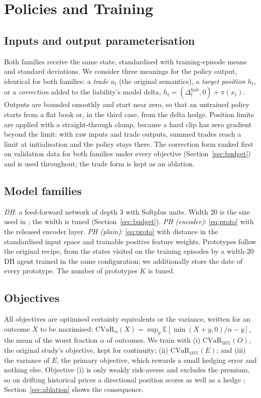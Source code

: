 \documentclass[10pt,conference]{IEEEtran}
\begin{document}
\section{Policies and Training}

\subsection{Inputs and output parameterisation}
\label{sec:param}
Both families receive the same state, standardised with training-episode
means and standard deviations. We consider three meanings for the policy
output, identical for both families: a \emph{trade} $a_t$ (the original
semantics), a \emph{target position} $h_t$, or a \emph{correction} added to
the liability's model delta, $h_t=(\Delta^{\mathrm{liab}}_t,0)+\pi(x_t)$.
Outputs are bounded smoothly and start near zero, so that an untrained policy
starts from a flat book or, in the third case, from the delta hedge. Position
limits are applied with a straight-through clamp, because a hard clip has
zero gradient beyond the limit: with raw inputs and trade outputs, summed
trades reach a limit at initialisation and the policy stays there. The
correction form ranked first on validation data for both families under every
objective (Section~\ref{sec:budget}) and is used throughout; the trade form
is kept as an ablation.

\subsection{Model families}
\emph{DH}: a feed-forward network of depth 3 with Softplus units. Width 20 is
the size used in \cite{buehler2019deep,faloughi2025protohedge}; the width is
tuned (Section~\ref{sec:budget}).
\emph{PH (encoder)}: \eqref{eq:proto} with the released encoder layer.
\emph{PH (plain)}: \eqref{eq:proto} with distance in the standardised input
space and trainable positive feature weights. Prototypes follow the original
recipe, from the states visited on the training episodes by a width-20 DH
agent trained in the same configuration; we additionally store the date of
every prototype. The number of prototypes $K$ is tuned.

\subsection{Objectives}
All objectives are optimised certainty equivalents
\cite{bental2007oce,rockafellar2000} or the variance, written for an outcome
$X$ to be maximised:
$\mathrm{CVaR}_\alpha(X)=\sup_y \mathbb E[\min(X+y,0)/\alpha-y]$, the mean of
the worst fraction $\alpha$ of outcomes. We train with (i)
$\mathrm{CVaR}_{50\%}(O)$, the original study's objective, kept for
continuity; (ii) $\mathrm{CVaR}_{10\%}(E)$; and (iii) the variance of $E$,
the primary objective, which rewards a small hedging error and nothing else.
Objective (i) is only weakly risk-averse and excludes the premium, so on
drifting historical prices a directional position scores as well as a hedge
\cite{buehler2021drift}; Section~\ref{sec:ablation} shows the consequence.
\end{document}
